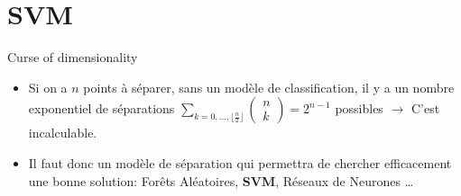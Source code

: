 \documentclass[8pt]{beamer}
\begin{document}
	\section[SVM]{SVM}
	\begin{frame}{Curse of dimensionality}
		\begin{itemize}
			\item <1-> Si on a $n$ points à séparer, sans un modèle de classification, il y a un nombre exponentiel de séparations $\sum_{k=0,\dots,\lfloor \frac{n}{2} \rfloor} \begin{pmatrix}
			n\\
			k
			\end{pmatrix} = 2^{n-1}$ possibles $\longrightarrow$ C'est incalculable.
			\item <2-> Il faut donc un modèle de séparation qui permettra de chercher efficacement une bonne solution: Forêts Aléatoires, \textbf{SVM}, Réseaux de Neurones \dots
		\end{itemize}
	\end{frame}
\end{document}
